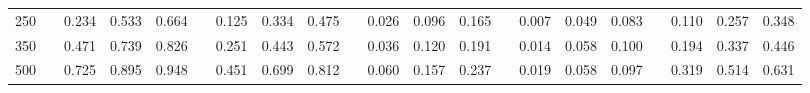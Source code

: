 % 
\begin{tabular}{ccccccccccccccccccccc}
  \hline
  \hline
250 &  & 0.234 & 0.533 & 0.664 &  & 0.125 & 0.334 & 0.475 &  & 0.026 & 0.096 & 0.165 &  & 0.007 & 0.049 & 0.083 &  & 0.110 & 0.257 & 0.348 \\ 
  350 &  & 0.471 & 0.739 & 0.826 &  & 0.251 & 0.443 & 0.572 &  & 0.036 & 0.120 & 0.191 &  & 0.014 & 0.058 & 0.100 &  & 0.194 & 0.337 & 0.446 \\ 
  500 &  & 0.725 & 0.895 & 0.948 &  & 0.451 & 0.699 & 0.812 &  & 0.060 & 0.157 & 0.237 &  & 0.019 & 0.058 & 0.097 &  & 0.319 & 0.514 & 0.631 \\ 
   \hline
\end{tabular}
